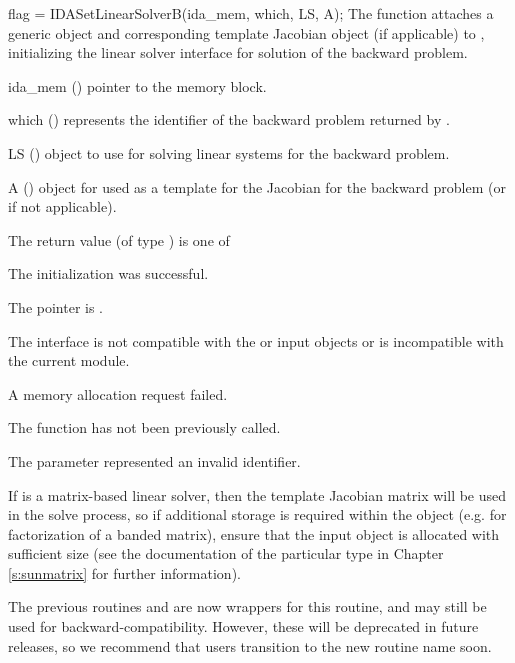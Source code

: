 {
  flag = IDASetLinearSolverB(ida\_mem, which, LS, A);
}
{
  The function  attaches a generic
  {\sunlinsol} object  and corresponding template
  Jacobian {\sunmatrix} object  (if applicable) to {\idas},
  initializing the {\idals} linear solver interface for solution of
  the backward problem.
}
{
  \begin{args}
  \item[ida\_mem] ()
    pointer to the {\idas} memory block.
  \item[which] ()
    represents the identifier of the backward problem returned by .
  \item[LS] ()
    {\sunlinsol} object to use for solving linear systems for the backward problem.
  \item[A] ()
    {\sunmatrix} object for used as a template for the Jacobian for the backward
    problem (or  if not applicable).
  \end{args}
}
{
  The return value  (of type ) is one of
  \begin{args}
  \item[\Id{IDALS\_SUCCESS}]
    The {\idals} initialization was successful.
  \item[\Id{IDALS\_MEM\_NULL}]
    The  pointer is .
  \item[\Id{IDALS\_ILL\_INPUT}]
    The {\idals} interface is not compatible with the  or
     input objects or is incompatible with the current
    {\nvector} module.
  \item[\Id{IDALS\_MEM\_FAIL}]
    A memory allocation request failed.
  \item[\Id{IDALS\_NO\_ADJ}]
    The function  has not been previously called.
  \item[\Id{IDALS\_ILL\_INPUT}]
    The parameter  represented an invalid identifier.
  \end{args}
}
{
  If  is a matrix-based linear solver, then the template
  Jacobian matrix  will be used in the solve process, so if
  additional storage is required within the {\sunmatrix} object
  (e.g. for factorization of a banded matrix), ensure that the input
  object is allocated with sufficient size (see the documentation of
  the particular {\sunmatrix} type in Chapter \ref{s:sunmatrix} for
  further information).

  The previous routines  and
   are now wrappers for this routine, and may
  still be used for backward-compatibility.  However, these will be
  deprecated in future releases, so we recommend that users transition
  to the new routine name soon.
}


